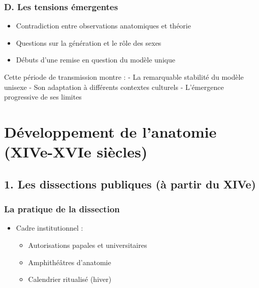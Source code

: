 \documentclass[
  letterpaper,
  DIV=11,
  numbers=noendperiod]{scrreprt}
\providecommand{\tightlist}{%
  \setlength{\itemsep}{0pt}\setlength{\parskip}{0pt}}\usepackage{longtable,booktabs,array}
\begin{document}
\subsection{D. Les tensions
émergentes}\label{d.-les-tensions-uxe9mergentes}

\begin{itemize}
\tightlist
\item
  Contradiction entre observations anatomiques et théorie
\item
  Questions sur la génération et le rôle des sexes
\item
  Débuts d'une remise en question du modèle unique
\end{itemize}

Cette période de transmission montre : - La remarquable stabilité du
modèle unisexe - Son adaptation à différents contextes culturels -
L'émergence progressive de ses limites

\subsection{}\label{section-2}


\chapter{Développement de l'anatomie (XIVe-XVIe
siècles)}\label{duxe9veloppement-de-lanatomie-xive-xvie-siuxe8cles}

\section{1. Les dissections publiques (à partir du
XIVe)}\label{les-dissections-publiques-uxe0-partir-du-xive}

\subsection{La pratique de la
dissection}\label{la-pratique-de-la-dissection}

\begin{itemize}
\tightlist
\item
  Cadre institutionnel :

  \begin{itemize}
  \tightlist
  \item
    Autorisations papales et universitaires
  \item
    Amphithéâtres d'anatomie
  \item
    Calendrier ritualisé (hiver)
  \end{itemize}
\end{itemize}
\end{document}
